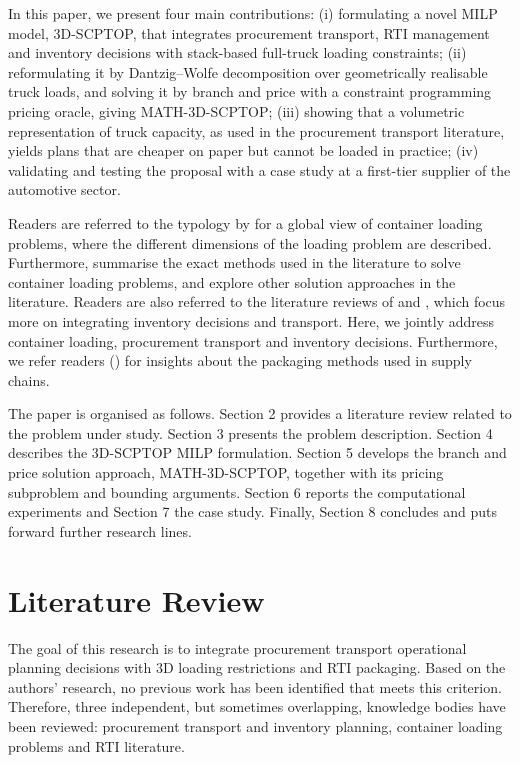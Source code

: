 {\color{blue}

In this paper, we present four main contributions: (i) formulating a novel MILP model, 3D-SCPTOP, that integrates procurement transport, RTI management and inventory decisions with stack-based full-truck loading constraints; (ii) reformulating it by Dantzig--Wolfe decomposition over geometrically realisable truck loads, and solving it by branch and price with a constraint programming pricing oracle, giving MATH-3D-SCPTOP; (iii) showing that a volumetric representation of truck capacity, as used in the procurement transport literature, yields plans that are cheaper on paper but cannot be loaded in practice; (iv) validating and testing the proposal with a case study at a first-tier supplier of the automotive sector.
}


Readers are referred to the typology by  \autocite{Wascher2007AnProblems} for a global view of container loading problems, where the different dimensions of the loading problem are described. Furthermore, \autocite{Silva2019ExactProblems} summarise the exact methods used in the literature to solve container loading problems, and \autocite{Zhao2016INTERNATIONALAlgorithms} explore other solution approaches in the literature. Readers are also referred to the literature reviews of \autocite{Mosca2019IntegratedReview} and \autocite{Diaz-Madronero2015ADecisions}, which focus more on integrating inventory decisions and transport. Here, we jointly address container loading, procurement transport and inventory decisions. {\color{blue} Furthermore, we refer readers () for insights about the packaging methods used in supply chains.}

{\color{blue}
The paper is organised as follows. Section 2 provides a literature review related to the problem under study. Section 3 presents the problem description. Section 4 describes the 3D-SCPTOP MILP formulation. Section 5 develops the branch and price solution approach, MATH-3D-SCPTOP, together with its pricing subproblem and bounding arguments. Section 6 reports the computational experiments and Section 7 the case study. Finally, Section 8 concludes and puts forward further research lines.
}

\section{Literature Review}

The goal of this research is to integrate procurement transport operational planning decisions with 3D loading restrictions and RTI packaging. Based on the authors’ research, no previous work has been identified that meets this criterion. Therefore, three independent, but sometimes overlapping, knowledge bodies have been reviewed: procurement transport and inventory planning, container loading problems and RTI literature.

